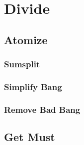 \section{Divide}
\subsection{Atomize}
\subsubsection{Sumsplit}
\subsubsection{Simplify Bang}
\subsubsection{Remove Bad Bang}
\subsection{Get Must}
